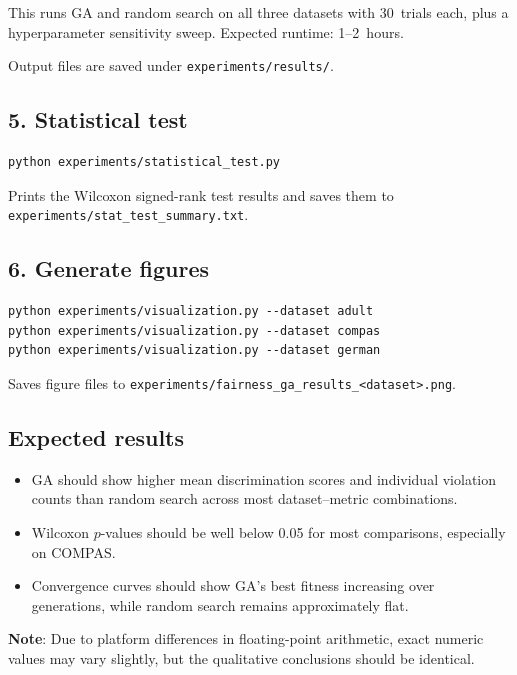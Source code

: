 \documentclass[10pt]{article}
\begin{document}
This runs GA and random search on all three datasets with 30~trials each, plus a
hyperparameter sensitivity sweep.  Expected runtime: 1--2~hours.

Output files are saved under \texttt{experiments/results/}.

\subsection*{5. Statistical test}

\begin{verbatim}
python experiments/statistical_test.py
\end{verbatim}

Prints the Wilcoxon signed-rank test results and saves them to\\
\texttt{experiments/stat\_test\_summary.txt}.

\subsection*{6. Generate figures}

\begin{verbatim}
python experiments/visualization.py --dataset adult
python experiments/visualization.py --dataset compas
python experiments/visualization.py --dataset german
\end{verbatim}

Saves figure files to \texttt{experiments/fairness\_ga\_results\_<dataset>.png}.

\subsection*{Expected results}

\begin{itemize}
    \item GA should show higher mean discrimination scores and individual violation
          counts than random search across most dataset--metric combinations.
    \item Wilcoxon $p$-values should be well below 0.05 for most comparisons,
          especially on COMPAS.
    \item Convergence curves should show GA's best fitness increasing over generations,
          while random search remains approximately flat.
\end{itemize}

\noindent\textbf{Note}: Due to platform differences in floating-point arithmetic, exact
numeric values may vary slightly, but the qualitative conclusions should be identical.
\end{document}
